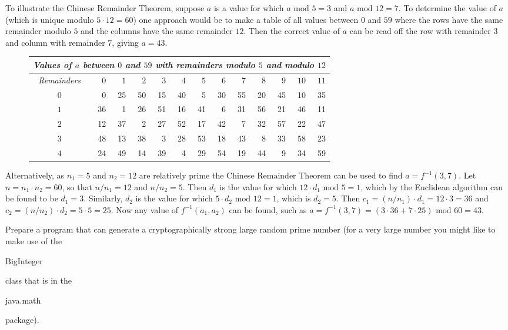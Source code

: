 To illustrate the Chinese Remainder Theorem, suppose $a$ is a value for which
$a\mbox{ mod }5=3$ and $a\mbox{ mod }12=7$. To determine the value of $a$
(which is unique modulo $5\cdot12=60$) one approach would be to make a table of all values
between $0$ and $59$ where the rows have the same remainder modulo $5$ and
the columns have the same remainder $12$. Then the correct value of $a$
can be read off the row with remainder $3$ and column with remainder $7$,
giving $a=43$.
\begin{figure*}[htb]\begin{center}
\begin{tabular}{|c||rrrrrrrrrrrr|} \hline
  \multicolumn{13}{|l|}{\textit{Values of $a$ between $0$ and $59$
    with remainders modulo $5$ and modulo $12$}} \\ \hline\hline
  \textit{Remainders} & \textit{$0$} & \textit{$1$} & \textit{$2$} & \textit{$3$}
  & \textit{$4$} & \textit{$5$} & \textit{$6$} & \textit{$7$}
  & \textit{$8$} & \textit{$9$} & \textit{$10$} & \textit{$11$} \\ \hline\hline
  \textit{$0$} & 0 & 25 & 50 & 15 & 40 & 5 & 30 & 55 & 20 & 45 & 10 & 35 \\
  \textit{$1$} & 36 & 1 & 26 & 51 & 16 & 41 & 6 & 31 & 56 & 21 & 46 & 11 \\
  \textit{$2$} & 12 & 37 & 2 & 27 & 52 & 17 & 42 & 7 & 32 & 57 & 22 & 47 \\
  \textit{$3$} & 48 & 13 & 38 & 3 & 28 & 53 & 18 & 43 & 8 & 33 & 58 & 23 \\
  \textit{$4$} & 24 & 49 & 14 & 39 & 4 & 29 & 54 & 19 & 44 & 9 & 34 & 59 \\\hline
\end{tabular}\end{center}
\end{figure*}
Alternatively, as $n_1=5$ and $n_2=12$ are relatively prime the Chinese Remainder Theorem
can be used to find $a=f^{-1}(3,7)$. Let $n=n_1\cdot n_2=60$,
so that $n/n_1=12$ and $n/n_2=5$. Then $d_1$ is the value for which
$12\cdot d_1\mbox{ mod }5=1$, which by the Euclidean algorithm can be found to be
$d_1=3$. Similarly, $d_2$ is the value for which $5\cdot d_2\mbox{ mod }12=1$,
which is $d_2=5$. Then $c_1=(n/n_1)\cdot d_1=12\cdot3=36$ and
$c_2=(n/n_2)\cdot d_2=5\cdot5=25$.
Now any value of $f^{-1}(a_1,a_2)$ can be found, such as
$a=f^{-1}(3,7)=(3\cdot36+7\cdot25)\mbox{ mod }60=43$.


\begin{exercise}
  Prepare a program that can generate a cryptographically strong large random prime number
  (for a very large number you might like to make use of the
  \begin{code}BigInteger\end{code} class that is in the \begin{code}java.math\end{code}
  package).
\end{exercise}


